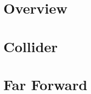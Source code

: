 \label{Chapter-10}

\hypertarget{Section-10.1}{%
\section{Overview}\label{Section-10.1}}

\hypertarget{Section-10.2}{%
\section{Collider}\label{Section-10.2}}

\hypertarget{Section-10.3}{%
\section{Far Forward}\label{Section-10.3}}


